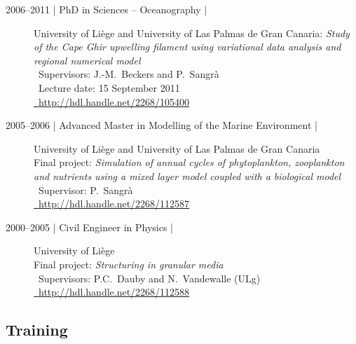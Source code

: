 \documentclass[11pt,a4paper,svgnames]{article}
\begin{document}
\begin{description}
\item[2006--2011 | PhD in Sciences -- Oceanography |] University of Li\`{e}ge and University of Las Palmas de Gran Canaria: \emph{Study of the Cape Ghir upwelling filament using variational data analysis and regional numerical model}\\
\faUser~Supervisors: J.-M.~Beckers and P.~Sangr\`{a}\\
\faCalendar~Lecture date: 15 September 2011\\
\href{http://hdl.handle.net/2268/105400}{\faLink~http://hdl.handle.net/2268/105400}

\item[2005--2006 | Advanced Master in Modelling of the Marine Environment |] University of Li\`{e}ge and University of Las Palmas de Gran Canaria\\
Final project: \emph{Simulation of annual cycles of phytoplankton, zooplankton and nutrients using a mixed layer model coupled with a biological model}\\
\faUser~Supervisor: P.~Sangr\`{a}\\
\href{http://hdl.handle.net/2268/112587}{\faLink~http://hdl.handle.net/2268/112587}

\item[2000--2005 | Civil Engineer in Physics | ] University of Li\`{e}ge\\
Final project: \emph{Structuring in granular media}\\
\faUser~Supervisors: P.C.~Dauby and N.~Vandewalle (ULg)\\
\href{http://hdl.handle.net/2268/112588}{\faLink~http://hdl.handle.net/2268/112588}


\end{description}


\subsection{Training}
\end{document}
